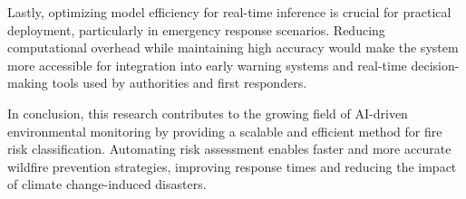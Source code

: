 Lastly, optimizing model efficiency for real-time inference is crucial for practical 
deployment, particularly in emergency response scenarios. Reducing computational overhead 
while maintaining high accuracy would make the system more accessible for integration into 
early warning systems and real-time decision-making tools used by authorities and first 
responders.

In conclusion, this research contributes to the growing field of AI-driven environmental 
monitoring by providing a scalable and efficient method for fire risk classification. 
Automating risk assessment enables faster and more accurate wildfire prevention strategies, 
improving response times and reducing the impact of climate change-induced disasters.
